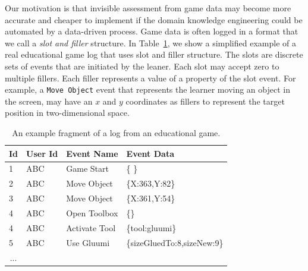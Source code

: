 \documentclass{sigchi}
\begin{document}
Our motivation is that invisible assessment from game data may become more accurate and cheaper to implement if the domain knowledge engineering could be automated by a data-driven process.
Game data is often logged  in a format that we call a \textit{slot and filler} structure.
In Table~\ref{tbl:log_example}, we show a simplified example of a real educational game log that uses slot and filler structure.
The slots are discrete sets of events that are initiated by the leaner.
Each slot may accept zero to multiple fillers. 
Each filler represents a value of a property of the slot event.
For example, a \texttt{Move Object} event  that represents the learner moving an object in the screen, may have an $x$ and $y$ coordinates as fillers to represent the target position in two-dimensional space.

\begin{table}[tbh]
	\begin{tabular}{@{}llll@{}}
		\toprule
		\textbf{Id}             & \textbf{User Id} & \textbf{Event Name} & \textbf{Event Data}        \\ \midrule
		1                       & ABC              & Game Start          & \{ \}                        \\
		2                       & ABC              & Move Object         & \{X:363,Y:82\} \\
		3                       & ABC              & Move Object         & \{X:361,Y:54\} \\
		4                       & ABC              & Open Toolbox        & \{\}        \\
		4                       & ABC              & Activate Tool        & \{tool:gluumi\}        \\
		5                       & ABC              & Use Gluumi        & \{sizeGluedTo:8,sizeNew:9\} \\        
		\multicolumn{1}{c}{...} &                  &                     &                            \\ \bottomrule
	\end{tabular}
	\caption{An example fragment of a log from an educational game. \label{tbl:log_example}}
\end{table}
\end{document}
